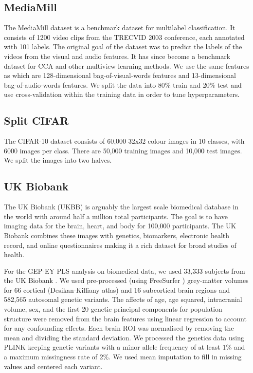 \subsection{MediaMill}
The MediaMill dataset \cite{feng2004context} is a benchmark dataset for multilabel classification. It consists of 1200 video clips from the TRECVID 2003 conference, each annotated with 101 labels. The original goal of the dataset was to predict the labels of the videos from the visual and audio features. It has since become a benchmark dataset for CCA and other multiview learning methods. We use the same features as \cite{gemp2022generalized} which are 128-dimensional bag-of-visual-words features and 13-dimensional bag-of-audio-words features. We split the data into 80\% train and 20\% test and use cross-validation within the training data in order to tune hyperparameters.

\subsection{Split CIFAR}
The CIFAR-10 dataset \cite{krizhevsky2009learning} consists of 60,000 32x32 colour images in 10 classes, with 6000 images per class. There are 50,000 training images and 10,000 test images. We split the images into two halves.

\subsection{UK Biobank}
The UK Biobank (UKBB) is arguably the largest scale biomedical database in the world with around half a million total participants. The goal is to have imaging data for the brain, heart, and body for 100,000 participants. The UK Biobank combines these images with genetics, biomarkers, electronic health record, and online questionnaires making it a rich dataset for broad studies of health.

For the GEP-EY PLS analysis on biomedical data, we used 33,333 subjects from the UK Biobank \cite{sudlow2015uk}. We used pre-processed (using FreeSurfer \cite{Fischl2012}) grey-matter volumes for 66 cortical (Desikan-Killiany atlas) and 16 subcortical brain regions and 582,565 autosomal genetic variants. The affects of age, age squared, intracranial volume, sex, and the first 20 genetic principal components for population structure were removed from the brain features using linear regression to account for any confounding effects. Each brain ROI was normalised by removing the mean and dividing the standard deviation. We processed the genetics data using PLINK \cite{Purcell2007} keeping genetic variants with a minor allele frequency of at least 1\%  and a maximum missingness rate of 2\%. We used mean imputation to fill in missing values and centered each variant.

